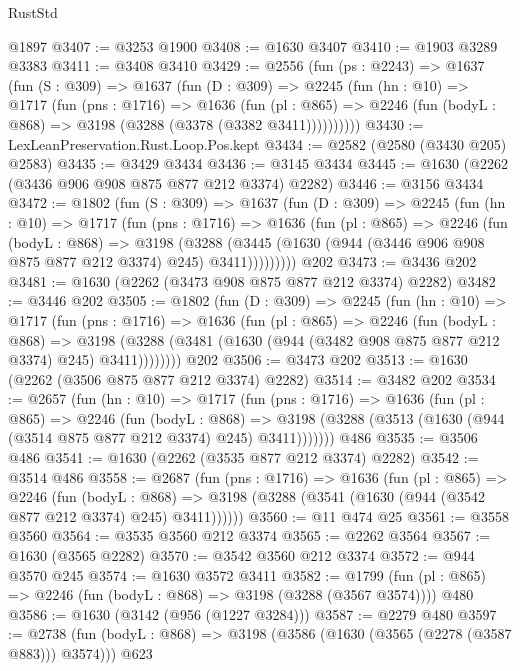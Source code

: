 \begin{lexlean}{RustStd}
\begin{coremodule}
    @1897
@3407 := @3253 @1900
@3408 := @1630 @3407
@3410 := @1903 @3289 @3383
@3411 := @3408 @3410
@3429 := @2556
    (fun (ps : @2243) =>
    @1637
      (fun (S : @309) =>
      @1637
        (fun (D : @309) =>
        @2245
          (fun (hn : @10) =>
          @1717
            (fun (pns : @1716) =>
            @1636
              (fun (pl : @865) =>
              @2246 (fun (bodyL : @868) => @3198 (@3288 (@3378 (@3382 @3411))))))))))
@3430 := LexLeanPreservation.Rust.Loop.Pos.kept
@3434 := @2582 (@2580 (@3430 @205) @2583)
@3435 := @3429 @3434
@3436 := @3145 @3434
@3445 := @1630 (@2262 (@3436 @906 @908 @875 @877 @212 @3374) @2282)
@3446 := @3156 @3434
@3472 := @1802
    (fun (S : @309) =>
    @1637
      (fun (D : @309) =>
      @2245
        (fun (hn : @10) =>
        @1717
          (fun (pns : @1716) =>
          @1636
            (fun (pl : @865) =>
            @2246
              (fun (bodyL : @868) =>
              @3198
                (@3288
                  (@3445 (@1630 (@944 (@3446 @906 @908 @875 @877 @212 @3374) @245) @3411)))))))))
    @202
@3473 := @3436 @202
@3481 := @1630 (@2262 (@3473 @908 @875 @877 @212 @3374) @2282)
@3482 := @3446 @202
@3505 := @1802
    (fun (D : @309) =>
    @2245
      (fun (hn : @10) =>
      @1717
        (fun (pns : @1716) =>
        @1636
          (fun (pl : @865) =>
          @2246
            (fun (bodyL : @868) =>
            @3198 (@3288 (@3481 (@1630 (@944 (@3482 @908 @875 @877 @212 @3374) @245) @3411))))))))
    @202
@3506 := @3473 @202
@3513 := @1630 (@2262 (@3506 @875 @877 @212 @3374) @2282)
@3514 := @3482 @202
@3534 := @2657
    (fun (hn : @10) =>
    @1717
      (fun (pns : @1716) =>
      @1636
        (fun (pl : @865) =>
        @2246
          (fun (bodyL : @868) =>
          @3198 (@3288 (@3513 (@1630 (@944 (@3514 @875 @877 @212 @3374) @245) @3411)))))))
    @486
@3535 := @3506 @486
@3541 := @1630 (@2262 (@3535 @877 @212 @3374) @2282)
@3542 := @3514 @486
@3558 := @2687
    (fun (pns : @1716) =>
    @1636
      (fun (pl : @865) =>
      @2246
        (fun (bodyL : @868) =>
        @3198 (@3288 (@3541 (@1630 (@944 (@3542 @877 @212 @3374) @245) @3411))))))
@3560 := @11 @474 @25
@3561 := @3558 @3560
@3564 := @3535 @3560 @212 @3374
@3565 := @2262 @3564
@3567 := @1630 (@3565 @2282)
@3570 := @3542 @3560 @212 @3374
@3572 := @944 @3570 @245
@3574 := @1630 @3572 @3411
@3582 := @1799 (fun (pl : @865) => @2246 (fun (bodyL : @868) => @3198 (@3288 (@3567 @3574)))) @480
@3586 := @1630 (@3142 (@956 (@1227 @3284)))
@3587 := @2279 @480
@3597 := @2738 (fun (bodyL : @868) => @3198 (@3586 (@1630 (@3565 (@2278 (@3587 @883))) @3574))) @623

\end{coremodule}
\end{lexlean}
